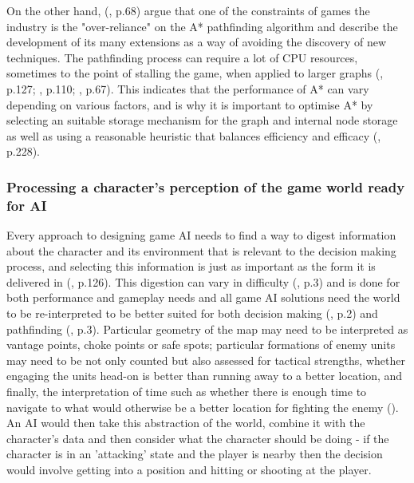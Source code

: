 \documentclass[11pt, a4paper]{article}
\begin{document}
On the other hand, \citeauthor{graham2003pathfinding} (\citeyear{graham2003pathfinding}, p.68) argue that one of the constraints of games the industry is the "over-reliance" on the A* pathfinding algorithm and describe the development of its many extensions as a way of avoiding the discovery of new techniques. The pathfinding process can require a lot of CPU resources, sometimes to the point of stalling the game, when applied to larger graphs (\cite{cui2011based}, p.127; \cite{stentz1996map}, p.110; \cite{graham2003pathfinding}, p.67). This indicates that the performance of A* can vary depending on various factors, and is why it is important to optimise A* by selecting an suitable storage mechanism for the graph and internal node storage as well as using a reasonable heuristic that balances efficiency and efficacy (\cite{millington2019ai}, p.228).

\subsubsection{Processing a character's perception of the game world ready for AI}

Every approach to designing game AI needs to find a way to digest information about the character and its environment that is relevant to the decision making process, and selecting this information is just as important as the form it is delivered in (\cite{cui2011based}, p.126). This digestion can vary in difficulty (\cite{diller2004behavior}, p.3) and is done for both performance and gameplay needs and all game AI solutions need the world to be re-interpreted to be better suited for both decision making (\cite{buro2004call}, p.2) and pathfinding (\cite{diller2004behavior}, p.3). Particular geometry of the map may need to be interpreted as vantage points, choke points or safe spots; particular formations of enemy units may need to be not only counted but also assessed for tactical strengths, whether engaging the units head-on is better than running away to a better location, and finally, the interpretation of time such as whether there is enough time to navigate to what would otherwise be a better location for fighting the enemy (\cite{buro2004call}). An AI would then take this abstraction of the world, combine it with the character's data and then consider what the character should be doing - if the character is in an 'attacking' state and the player is nearby then the decision would involve getting into a position and hitting or shooting at the player. 
\end{document}
